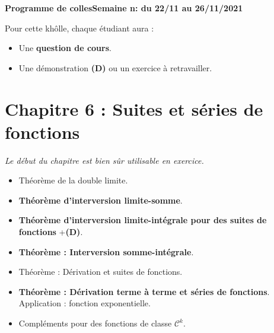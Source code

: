 \documentclass[twoside,a4paper,french,10pt]{VcCours}
\begin{document}

\begin{center}
\large\bf
Programme de collesSemaine n: du 22/11 au 26/11/2021
\end{center}
\separationTitre


Pour cette khôlle, chaque étudiant aura :
\begin{itemize}
\item Une \textbf{question de cours}.
\item Une démonstration \textbf{(D)} ou un exercice à retravailler.
\end{itemize}



\section*{Chapitre 6 : Suites et séries de fonctions}

\emph{Le début du chapitre est bien sûr utilisable en exercice.}
\begin{itemize}
\item Théorème de la double limite.
\item \textbf{Théorème d'interversion limite-somme}.
\item \textbf{Théorème d'interversion limite-intégrale pour des suites de fonctions} +\textbf{(D)}.
\item \textbf{Théorème : Interversion somme-intégrale}.
\item Théorème : Dérivation et suites de fonctions.
\item \textbf{Théorème : Dérivation terme à terme et séries de fonctions}. Application : fonction exponentielle.
\item Compléments pour des fonctions de classe $\mathcal{C}^k$.
\end{itemize}




\end{document}
